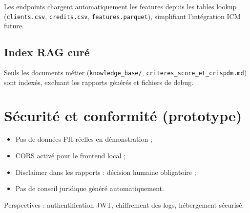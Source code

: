 Les endpoints  chargent automatiquement les features depuis les tables lookup (\texttt{clients.csv}, \texttt{credits.csv}, \texttt{features.parquet}), simplifiant l'intégration ICM future.

\subsection{Index RAG curé}

Seuls les documents métier (\texttt{knowledge\_base/}, \texttt{criteres\_score\_et\_crispdm.md}) sont indexés, excluant les rapports générés et fichiers de debug.

\section{Sécurité et conformité (prototype)}

\begin{itemize}[leftmargin=*]
  \item Pas de données PII réelles en démonstration ;
  \item CORS activé pour le frontend local ;
  \item Disclaimer dans les rapports : décision humaine obligatoire ;
  \item Pas de conseil juridique généré automatiquement.
\end{itemize}

Perspectives : authentification JWT, chiffrement des logs, hébergement sécurisé.
